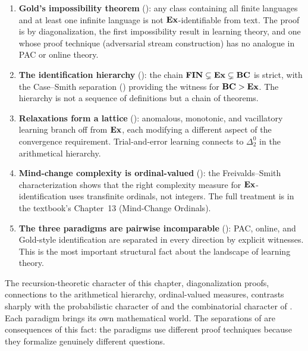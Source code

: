 \begin{enumerate}[leftmargin=*,itemsep=3pt]
\item \textbf{Gold's impossibility theorem} (): any class containing all finite languages and at least one infinite language is not $\mathbf{Ex}$-identifiable from text. The proof is by diagonalization, the first impossibility result in learning theory, and one whose proof technique (adversarial stream construction) has no analogue in PAC or online theory.

\item \textbf{The identification hierarchy} (): the chain $\mathbf{FIN} \subsetneq \mathbf{Ex} \subsetneq \mathbf{BC}$ is strict, with the Case--Smith separation () providing the witness for $\mathbf{BC} > \mathbf{Ex}$. The hierarchy is not a sequence of definitions but a chain of theorems.

\item \textbf{Relaxations form a lattice} (): anomalous, monotonic, and vacillatory learning branch off from $\mathbf{Ex}$, each modifying a different aspect of the convergence requirement. Trial-and-error learning connects to $\Delta^0_2$ in the arithmetical hierarchy.

\item \textbf{Mind-change complexity is ordinal-valued} (): the Freivalds--Smith characterization shows that the right complexity measure for $\mathbf{Ex}$-identification uses transfinite ordinals, not integers. The full treatment is in the textbook's Chapter~13 (Mind-Change Ordinals).

\item \textbf{The three paradigms are pairwise incomparable} (): PAC, online, and Gold-style identification are separated in every direction by explicit witnesses. This is the most important structural fact about the landscape of learning theory.
\end{enumerate}

The recursion-theoretic character of this chapter, diagonalization proofs, connections to the arithmetical hierarchy, ordinal-valued measures, contrasts sharply with the probabilistic character of  and the combinatorial character of . Each paradigm brings its own mathematical world. The separations of  are consequences of this fact: the paradigms use different proof techniques because they formalize genuinely different questions.


